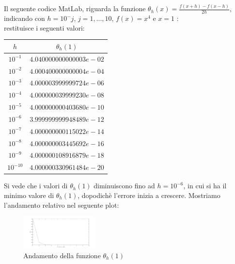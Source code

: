 Il seguente codice MatLab, riguarda la funzione $\theta_{h}(x) = \frac{f(x+h)-f(x-h)}{2h}$, indicando con $h=10^-j$, $j=1,...,10$, $f(x)=x^4$ e $x=1$ :\\
	
restituisce i seguenti valori:\\
\begin{center}
	\begin{tabular}{|c|c|}
		\hline
			$h$ & $\theta_{h}(1)$  \\
		\hline
    		\(10^{-1}\) & $4.040000000000003e-02$\\
    		\(10^{-2}\) & $4.000400000000004e-04$\\
    		\(10^{-3}\) & $4.000003999999724e-06$\\
    		\(10^{-4}\) & $4.000000039999230e-08$\\
    		\(10^{-5}\) & $4.000000000403680e-10$\\
    		\(10^{-6}\) & $3.999999999948489e-12$\\
    		\(10^{-7}\) & $4.000000000115022e-14$\\
    		\(10^{-8}\) & $4.000000003445692e-16$\\
    		\(10^{-9}\) & $4.000000108916879e-18$\\
    		\(10^{-10}\) & $4.000000330961484e-20$\\
		\hline
	\end{tabular}
\end{center} 
Si vede che i valori di $\theta_{h}(1)$ diminuiscono fino ad $h = 10^{-6}$, in cui si ha il minimo valore di $\theta_{h}(1)$, dopodichè l'errore inizia a crescere. Mostriamo l'andamento relativo nel seguente plot:
\begin{figure}[H]
	\label{Cap_1_Es_3}
	\includegraphics[left, width=150px]{Plot/Cap_1_Es_3}
		\caption{Andamento della funzione $\theta_{h}(1)$}
\end{figure}